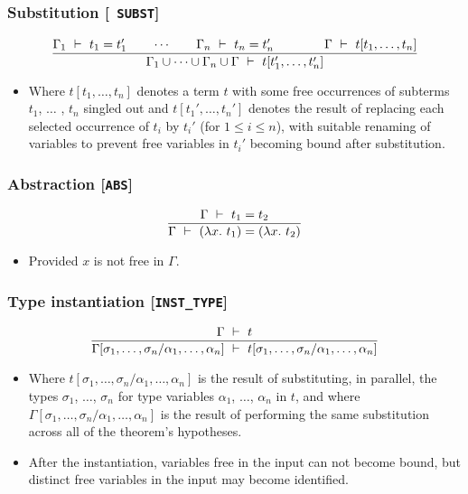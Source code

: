 \subsubsection*{Substitution [{\small\tt
SUBST}]} 
\[
\frac{\Gamma_1\ \vdash\  t_1 = t_1'\qquad\cdots\qquad\Gamma_n\ \vdash\  t_n =
t_n'\qquad\qquad \Gamma\ \vdash\  t[t_1,\ldots,t_n]}
{\Gamma_1\cup\cdots\cup\Gamma_n\cup\Gamma\ \vdash\  t[t_1',\ldots,t_n']}
\]
\begin{itemize}
\item Where $t[t_1,\ldots,t_n]$ denotes a term $t$ with some free
occurrences of subterms $t_1$, $\ldots$ , $t_n$ singled out and
$t[t_1',\ldots,t_n']$ denotes the result of replacing each selected
occurrence of $t_i$ by $t_i'$ (for $1{\leq}i{\leq}n$), with suitable
renaming of variables to prevent free variables in $t_i'$ becoming
bound after substitution.
\end{itemize}

\subsubsection*{Abstraction [{\small\tt ABS}]}
\[
\frac{\Gamma\ \vdash\  t_1 = t_2}
{\Gamma\ \vdash\  (\lambda x.\ t_1) = (\lambda x.\ t_2)}
\]
\begin{itemize}
\item Provided $x$ is not free in $\Gamma$.
\end{itemize}

\subsubsection*{Type instantiation [{\small\tt INST\_TYPE}]}
\newcommand{\insttysub}{[\sigma_1,\ldots,\sigma_n/\alpha_1,\ldots,\alpha_n]}
\[
\frac{\Gamma\turn t}
{\Gamma\insttysub\turn t\insttysub}
\]
\begin{itemize}
\item Where $t\insttysub$ is the result of substituting, in parallel,
  the types $\sigma_1$, $\dots$, $\sigma_n$ for type variables
  $\alpha_1$, $\dots$, $\alpha_n$ in $t$, and where $\Gamma\insttysub$
  is the result of performing the same substitution across all of the
  theorem's hypotheses.
\item After the instantiation, variables free in the input can not
  become bound, but distinct free variables in the input may become
  identified.
\end{itemize}

